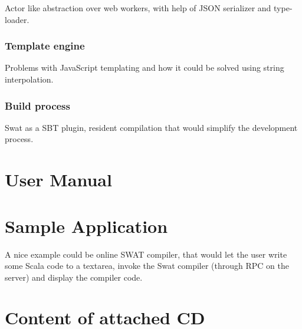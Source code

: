 \documentclass[12pt,a4paper]{report}
\begin{document}
Actor like abstraction over web workers, with help of JSON serializer and type-loader.

\subsection{Template engine}

Problems with JavaScript templating and how it could be solved using string interpolation.

\subsection{Build process}

Swat as a SBT plugin, resident compilation that would simplify the development process.



\def\bibname{Bibliography}







\appendix
\appendixpage
\addappheadtotoc

\chapter{User Manual}

\chapter{Sample Application}

A nice example could be online SWAT compiler, that would let the user write some Scala code to a textarea, invoke the Swat compiler (through RPC on the server) and display the compiler code.



\chapter{Content of attached CD}





\printnomenclature
\end{document}
